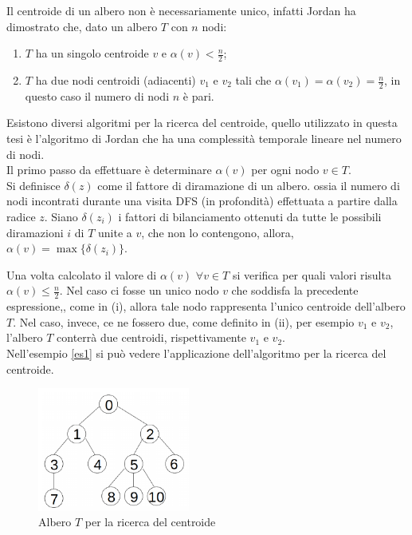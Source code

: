Il centroide di un albero non \`e necessariamente unico, infatti Jordan \cite{jordan1869assemblages}  ha dimostrato che, dato un albero $ T $ con $ n $ nodi:
\begin{enumerate}
	\renewcommand{\labelenumi}{\roman{enumi}}
	\item $ T $ ha un singolo centroide $ v $ e $\alpha(v) < \frac{n}{2}$;
	\item$ T $ ha due nodi centroidi (adiacenti) $v_1$ e $v_2$ tali che $\alpha(v_1) = \alpha(v_2) = \frac{n}{2}$, in questo caso il numero di nodi $ n $ \`e pari.
\end{enumerate}

Esistono diversi algoritmi per la ricerca del centroide, quello utilizzato in questa tesi \`e l'algoritmo di Jordan \cite{jordan1869assemblages} che  ha una complessit\`a temporale lineare nel numero di nodi. \\
Il primo passo da effettuare \`e determinare $\alpha(v)$ per ogni nodo $ v \in T$.\\
Si definisce  $\delta(z)$ come il fattore di diramazione di un albero. ossia il numero di nodi incontrati durante una visita DFS (in profondit\`a) effettuata a partire dalla radice $ z $.
Siano $\delta(z_i)$ i fattori di bilanciamento ottenuti da tutte le possibili diramazioni $ i $ di $ T $ unite a $ v $, che non lo contengono, allora, $ \alpha(v) = \max \{\delta(z_i)\} $.

Una volta calcolato il valore di $ \alpha(v) $ $ \forall v \in T $ si verifica per quali valori  risulta $\alpha(v)\le\frac{n}{2}$.
Nel caso ci fosse un unico nodo $ v $ che soddisfa la precedente espressione,, come in (i),  allora tale nodo rappresenta l'unico  centroide dell'albero $ T $.
Nel caso, invece, ce ne fossero due, come definito in (ii), per esempio $ v_1 $ e $ v_2 $,  l'albero $ T $ conterr\`a due centroidi, rispettivamente $ v_1 $ e $ v_2 $.\\
Nell'esempio \ref{es1} si pu\`o vedere l'applicazione dell'algoritmo per la ricerca del centroide.
	\begin{figure}[htbp]
		\centering
		\includegraphics[width=5cm]{capitolo3/grafo2}
		\caption{Albero $ T $  per la ricerca del centroide} 
		\label{fig:2}
\end{figure}
\mbox{}\\

